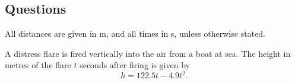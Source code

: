 \subsection*{Questions}
All distances are given in \si{\metre}, and all times in \si{\second}, unless otherwise stated.
\begin{questions}
  \question A distress flare is fired vertically into the air from a boat at sea. The height in metres of the flare $ t $ seconds
            after firing is given by
            \begin{displaymath}
              h = 122.5t - 4.9t^2.
            \end{displaymath}
\end{questions}
